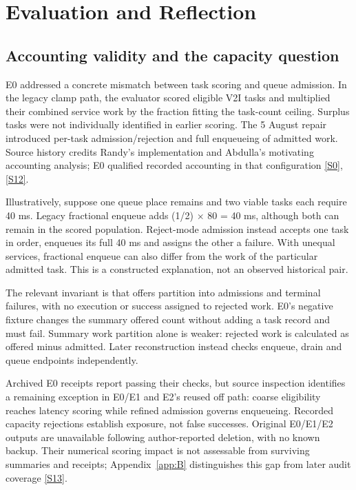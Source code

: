\documentclass[11pt,a4paper]{article}
\begin{document}
\section{Evaluation and Reflection}\label{sec:3}

\subsection{Accounting validity and the capacity question}\label{sec:3.1}

E0 addressed a concrete mismatch between task scoring and queue admission. In the legacy clamp path, the evaluator scored eligible V2I tasks and multiplied their combined service work by the fraction fitting the task-count ceiling. Surplus tasks were not individually identified in earlier scoring. The 5 August repair introduced per-task admission/rejection and full enqueueing of admitted work. Source history credits Randy's implementation and Abdulla's motivating accounting analysis; E0 qualified recorded accounting in that configuration \hyperref[source-s0]{[S0]}, \hyperref[source-s12]{[S12]}.

Illustratively, suppose one queue place remains and two viable tasks each require 40 ms. Legacy fractional enqueue adds (1/2) \ensuremath{\times} 80 = 40 ms, although both can remain in the scored population. Reject-mode admission instead accepts one task in order, enqueues its full 40 ms and assigns the other a failure. With unequal services, fractional enqueue can also differ from the work of the particular admitted task. This is a constructed explanation, not an observed historical pair.

The relevant invariant is that offers partition into admissions and terminal failures, with no execution or success assigned to rejected work. E0's negative fixture changes the summary offered count without adding a task record and must fail. Summary work partition alone is weaker: rejected work is calculated as offered minus admitted. Later reconstruction instead checks enqueue, drain and queue endpoints independently.

Archived E0 receipts report passing their checks, but source inspection identifies a remaining exception in E0/E1 and E2's reused off path: coarse eligibility reaches latency scoring while refined admission governs enqueueing. Recorded capacity rejections establish exposure, not false successes. Original E0/E1/E2 outputs are unavailable following author-reported deletion, with no known backup. Their numerical scoring impact is not assessable from surviving summaries and receipts; Appendix~\ref{app:B} distinguishes this gap from later audit coverage \hyperref[source-s13]{[S13]}.
\end{document}
